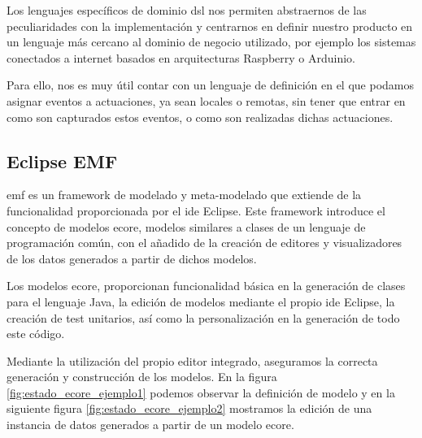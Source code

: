 Los lenguajes específicos de dominio \gls{dsl} nos permiten abstraernos de las peculiaridades con la implementación y centrarnos en definir nuestro producto en un lenguaje más cercano al dominio de negocio utilizado, por ejemplo los sistemas conectados a internet basados en arquitecturas Raspberry o Arduinio.

Para ello, nos es muy útil contar con un lenguaje de definición en el que podamos asignar eventos a actuaciones, ya sean locales o remotas, sin tener que entrar en como son capturados estos eventos, o como son realizadas dichas actuaciones.

\subsection{Eclipse EMF}

\gls{emf} \cite{EclipseEMF} es un \gls{framework} de modelado y meta-modelado que extiende de la funcionalidad proporcionada por el \gls{ide} Eclipse.
Este \gls{framework} introduce el concepto de modelos \gls{ecore}, modelos similares a clases de un lenguaje de programación común, con el añadido de la creación de editores y visualizadores de los datos generados a partir de dichos modelos.

Los modelos \gls{ecore}, proporcionan funcionalidad básica en la generación de clases para el lenguaje Java,  la  edición de modelos mediante el propio \gls{ide} Eclipse, la creación de test unitarios, así como la personalización en la generación de todo este código.

Mediante la utilización del propio editor integrado, aseguramos la correcta generación y construcción de los modelos. En la figura \ref{fig:estado_ecore_ejemplo1} podemos observar la definición de modelo y en la siguiente figura \ref{fig:estado_ecore_ejemplo2} mostramos la edición de una instancia de datos generados a partir de un modelo \gls{ecore}.





